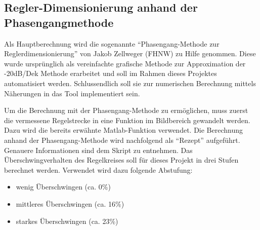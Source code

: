 \clearpage
\subsection{Regler-Dimensionierung anhand der Phasengangmethode}

Als     Hauptberechnung    wird     die    sogenannte     ``Phasengang-Methode
zur      Reglerdimensionierung''      von     Jakob      Zellweger      (FHNW)
\cite{regelungstechnik:zellweger_short}   zu   Hilfe   genommen. Diese   wurde
urspr\"unglich  als  vereinfachte  grafische  Methode  zur  Approximation  der
-20dB/Dek Methode erarbeitet und soll im Rahmen dieses Projektes automatisiert
werden. Schlussendlich   soll   sie   zur   numerischen   Berechnung   mittels
N\"aherungen in das Tool implementiert sein.

Um  die   Berechnung  mit   der  Phasengang-Methode  zu   erm\"oglichen,  muss
zuerst   die  vermessene   Regelstrecke  in   eine  Funktion   im  Bildbereich
gewandelt   werden. Dazu   wird   die   bereits   erw\"ahnte   Matlab-Funktion
  verwendet. Die  Berechnung  anhand  der  Phasengang-Methode
wird  nachfolgend  als  ``Rezept'' aufgef\"uhrt. Genauere  Informationen  sind
dem   Skript   \cite{regelungstechnik:zellweger_short}  zu   entnehmen.    Das
\"Uberschwingverhalten  des Regelkreises  soll  f\"ur dieses  Projekt in  drei
Stufen berechnet werden. Verwendet wird dazu folgende Abstufung:


\begin{itemize}
    \item
        wenig \"Uberschwingen (ca. 0\%)
    \item
        mittleres \"Uberschwingen (ca. 16\%)
    \item
        starkes \"Uberschwingen (ca. 23\%)
\end{itemize}

